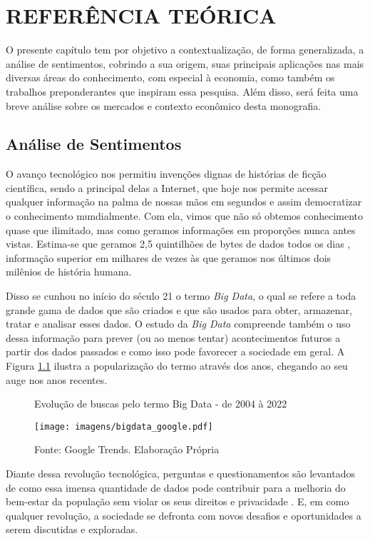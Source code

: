 \chapter{REFERÊNCIA TEÓRICA}

O presente capítulo tem por objetivo a contextualização, de forma generalizada, a análise de sentimentos, cobrindo a sua origem, suas principais aplicações nas mais diversas áreas do conhecimento, com especial à economia, como também os trabalhos preponderantes que inspiram essa pesquisa. Além disso, será feita uma breve análise sobre os mercados e contexto econômico desta monografia.

\section{Análise de Sentimentos}

O avanço tecnológico nos permitiu invenções dignas de histórias de ficção científica, sendo a principal delas a Internet, que hoje nos permite acessar qualquer informação na palma de nossas mãos em segundos e assim democratizar o conhecimento mundialmente. Com ela, vimos que não só obtemos conhecimento quase que ilimitado, mas como geramos informações em proporções nunca antes vistas. Estima-se que geramos 2,5 quintilhões de bytes de dados todos os dias , informação superior em milhares de vezes às que geramos nos últimos dois milênios de história humana.

Disso se cunhou no início do século 21 o termo \textit{Big Data}, o qual se refere a toda grande gama de dados que são criados e que são usados para obter, armazenar, tratar e analisar esses dados. O estudo da \textit{Big Data} compreende também o uso dessa informação para prever (ou ao menos tentar) acontecimentos futuros a partir dos dados passados e como isso pode favorecer a sociedade em geral. A Figura \ref{fig: bigdata} ilustra a popularização do termo através dos anos, chegando ao seu auge nos anos recentes.  

\begin{figure}[!h]
    \centering
    \caption{Evolução de buscas pelo termo Big Data - de 2004 à 2022}
    \texttt{[image: imagens/bigdata\_google.pdf]}
    \label{fig: bigdata}
    \caption*{Fonte: Google Trends. Elaboração Própria}
\end{figure}

Diante dessa revolução tecnológica, perguntas e questionamentos são levantados de como essa imensa quantidade de dados pode contribuir para a melhoria do bem-estar da população sem violar os seus direitos e privacidade . E, em como qualquer revolução, a sociedade se defronta com novos desafios e oportunidades a serem discutidas e exploradas.

